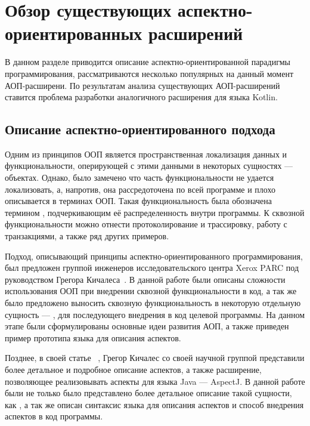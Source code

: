 \chapter{Обзор существующих аспектно-ориентированных расширений}
В данном разделе приводится описание аспектно-ориентированной парадигмы
программирования, рассматриваются несколько популярных на данный момент
АОП-расширени.
По результатам анализа существующих АОП-расширений ставится проблема разработки
аналогичного расширения для языка Kotlin.
\section{Описание аспектно-ориентированного подхода}
\label{sec:aop_description}
Одним из принципов ООП является пространственная локализация данных и функциональности, оперирующей с этими данными в некоторых сущностях --- объектах.
Однако, было замечено что часть функциональности не удается локализовать, а, напротив, она рассредоточена по всей программе и плохо описывается в терминах ООП.
Такая функциональность была обозначена термином , подчеркивающим её распределенность внутри программы.
К сквозной функциональности можно отнести протоколирование и трассировку, работу с транзакциями, а также ряд других примеров.

Подход, описывающий принципы аспектно-ориентированного программирования, был
предложен группой инженеров исследовательского центра Xerox PARC под
руководством Грегора Кичалеса~\cite{kiczales_aop}.
В данной работе были описаны сложности использования ООП при внедрении сквозной
функциональности в код, а так же было предложено выносить сквозную
функциональность в некоторую отдельную сущность --- , для
последующего внедрения в код целевой программы.
На данном этапе были сформулированы основные идеи развития АОП, а также приведен
пример прототипа языка для описания аспектов.

Позднее, в своей статье ~\cite{kiczales_aspectj},
Грегор Кичалес со своей научной группой представили более детальное и подробное
описание аспектов, а также расширение, позволяющее реализовывать аспекты для
языка Java --- AspectJ.
В данной работе были не только было представлено более детальное описание такой
сущности, как , а так же описан синтаксис языка для описания
аспектов и способ внедрения аспектов в код программы.

